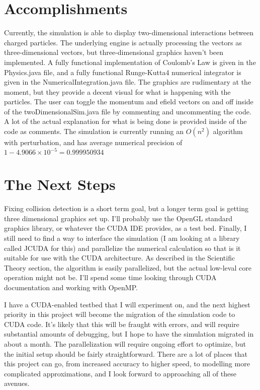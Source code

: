\documentclass[10pt]{article}
\begin{document}
\clearpage
\section{Accomplishments}
Currently, the simulation is able to display two-dimensional interactions between charged particles. The underlying engine is actually processing the vectors as three-dimensional vectors, but three-dimensional graphics haven't been implemented. A fully functional implementation of Coulomb's Law is given in the Physics.java file, and a fully functional Runge-Kutta4 numerical integrator is given in the NumericalIntegration.java file. The graphics are rudimentary at the moment, but they provide a decent visual for what is happening with the particles. The user can toggle the momentum and efield vectors on and off inside of the twoDimensionalSim.java file by commenting and uncommenting the code. A lot of the actual explanation for what is being done is provided inside of the code as comments. The simulation is currently running an $O(n^2)$ algorithm with perturbation, and has average numerical precision of $1 - 4.9066 \times 10^{-5} = 0.999950934$

\section{The Next Steps}
Fixing collision detection is a short term goal, but a longer term goal is getting three dimensional graphics set up. I'll probably use the OpenGL standard graphics library, or whatever the CUDA IDE provides, as a test bed. Finally, I still need to find a way to interface the simulation (I am looking at a library called JCUDA for this) and parallelize the numerical calculation so that is it suitable for use with the CUDA architecture. As described in the Scientific Theory section, the algorithm is easily parallelized, but the actual low-leval core operation might not be. I'll spend some time looking through CUDA documentation and working with OpenMP. 

I have a CUDA-enabled testbed that I will experiment on, and the next highest priority in this project will become the migration of the simulation code to CUDA code. It's likely that this will be fraught with errors, and will require substantial amounts of debugging, but I hope to have the simulation migrated in about a month. The parallelization will require ongoing effort to optimize, but the initial setup should be fairly straightforward. There are a lot of places that this project can go, from increased accuracy to higher speed, to modelling more complicated approximations, and I look forward to approaching all of these avenues.
\end{document}
